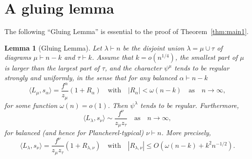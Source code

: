 \documentclass[12pt]%
{amsart}
\newcommand{\la}{{\lambda}}
\newcommand{\al}{{\alpha}}
\newcommand{\om}{{\omega}}
\theoremstyle{plain}
\newtheorem{lemma}[theorem]{Lemma}
\theoremstyle{definition}
\theoremstyle{remark}
\newtheorem{remark}[theorem]{Remark}
\begin{document}



\section{A gluing lemma}\label{sec:gluing}

The following ``Gluing Lemma'' is essential to the proof of Theorem~\ref{thm:main1}.

\begin{lemma}[Gluing Lemma]\label{l:gluing}
    Let $\la\vdash n$ be the disjoint union $\la=\mu\cup\tau$ of diagrams $\mu\vdash n-k$ and $\tau\vdash k$. Assume that 
    $k=o(n^{1/4})$,
    the smallest part of $\mu$ is larger than the largest part of $\tau$, 
    and the character $\psi^\mu$ tends to be regular strongly and uniformly,  
    in the sense that for any balanced $\al\vdash n-k$
\[
    \langle L_\mu,s_\al\rangle=\frac{f^\al}{z_\mu}(1+R_\al) 
    \quad \text{with} \quad |R_\al| < \omega(n-k) 
    \quad \text{as} \quad n \to \infty,
\]
    for some function $\omega(n)=o(1)$.
    Then $\psi^\la$ tends to be regular. Furthermore,
    \[
        \langle L_\la,s_\nu \rangle
        \sim \frac{f^\nu}{z_\mu z_\tau}
        \quad \text{as} \quad n \to \infty,
    \] 
    for balanced (and hence for Plancherel-typical) $\nu\vdash n$. More precisely, 
    \[
        \langle L_\la,s_\nu\rangle=\frac{f^\nu}{z_\mu z_\tau} (1+R_{\la,\nu})
        \quad \text{with} \quad
        |R_{\la,\nu}| \le O(\om(n-k) + k^2n^{-1/2}).
    \]
\end{lemma}
\end{document}
